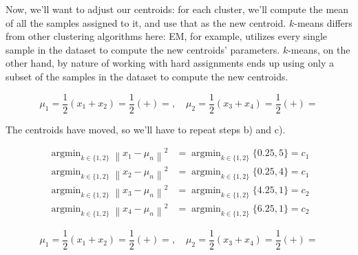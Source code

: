 \documentclass[12pt]{article}
\begin{document}
\begin{enumerate}[leftmargin=\labelsep]
  Now, we'll want to adjust our centroids: for each cluster, we'll compute the mean of all
  the samples assigned to it, and use that as the new centroid. $k$-means differs from
  other clustering algorithms here: EM, for example, utilizes every single sample in the
  dataset to compute the new centroids' parameters. $k$-means, on the other hand, by
  nature of working with hard assignments ends up using only a subset of the samples
  in the dataset to compute the new centroids.

  \begin{equation*}
    \mu_1 = \frac{1}{2} \left( x_1 + x_2 \right) = \frac{1}{2} \left(  +  \right) = , \quad
    \mu_2 = \frac{1}{2} \left( x_3 + x_4 \right) = \frac{1}{2} \left(  +  \right) = 
  \end{equation*}

  The centroids have moved, so we'll have to repeat steps b) and c).

  \begin{equation*}
    \begin{aligned}
      \operatorname{argmin}_{k \in \{1, 2\}} \left\| x_1 - \mu_n \right\|^2 & = \operatorname{argmin}_{k \in \{1, 2\}} \{0.25, 5\} = c_1 \\
      \operatorname{argmin}_{k \in \{1, 2\}} \left\| x_2 - \mu_n \right\|^2 & = \operatorname{argmin}_{k \in \{1, 2\}} \{0.25, 4\} = c_1 \\
      \operatorname{argmin}_{k \in \{1, 2\}} \left\| x_3 - \mu_n \right\|^2 & = \operatorname{argmin}_{k \in \{1, 2\}} \{4.25, 1\} = c_2 \\
      \operatorname{argmin}_{k \in \{1, 2\}} \left\| x_4 - \mu_n \right\|^2 & = \operatorname{argmin}_{k \in \{1, 2\}} \{6.25, 1\} = c_2
    \end{aligned}
  \end{equation*}

  \begin{equation*}
    \mu_1 = \frac{1}{2} \left( x_1 + x_2 \right) = \frac{1}{2} \left(  +  \right) = , \quad
    \mu_2 = \frac{1}{2} \left( x_3 + x_4 \right) = \frac{1}{2} \left(  +  \right) = 
  \end{equation*}


\end{enumerate}
\end{document}
